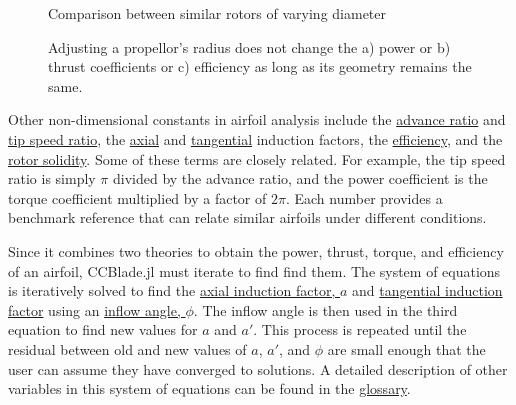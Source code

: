 \documentclass{article}
\begin{document}
\begin{figure}
  \centering
  \caption{Comparison between similar rotors of varying diameter}
  \captionsetup{aboveskip=0pt,font=it}
  \caption*{Adjusting a propellor's radius does not change the a) power or b) thrust coefficients or c) efficiency as long as its geometry remains the same.}
  \label{fig:1}
\end{figure}

Other non-dimensional constants in airfoil analysis include the \hyperlink{J}{advance ratio} and \hyperlink{lambda}{tip speed ratio}, the \hyperlink{a}{axial} and \hyperlink{a'}{tangential} induction factors, the \hyperlink{eta}{efficiency}, and the \hyperlink{sigma}{rotor solidity}. Some of these terms are closely related. For example, the tip speed ratio is simply $\pi$ divided by the advance ratio, and the power coefficient is the torque coefficient multiplied by a factor of $2 \pi$. Each number provides a benchmark reference that can relate similar airfoils under different conditions. \newline 

Since it combines two theories to obtain the power, thrust, torque, and efficiency of an airfoil, CCBlade.jl must iterate to find find them. The system of equations is iteratively solved to find the  \hyperlink{a}{axial induction factor, $a$} and \hyperlink{a'}{tangential induction factor} using an \hyperlink{phi}{inflow angle, $\phi$}. The inflow angle is then used in the third equation to find new values for $a$ and $a'$. This process is repeated until the residual between old and new values of $a$, $a'$, and $\phi$ are small enough that the user can assume they have converged to solutions. A detailed description of other variables in this system of equations can be found in the \hyperlink{BEM}{glossary}. \newline
\end{document}
